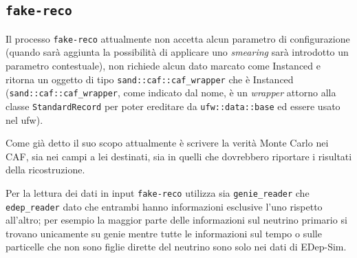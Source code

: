 \documentclass[../../main.tex]{subfiles}
\begin{document}
\subsection*{\texttt{fake-reco}}
  Il processo \texttt{fake-reco} attualmente non accetta alcun parametro di
  configurazione (quando sarà aggiunta la possibilità di applicare uno
  \textit{smearing} sarà introdotto un parametro contestuale), non richiede
  alcun dato marcato come Instanced e ritorna un oggetto di tipo
  \texttt{sand::caf::caf\_wrapper} che è Instanced
  (\texttt{sand::caf::caf\_wrapper}, come indicato dal nome, è un
  \textit{wrapper} attorno alla classe \texttt{StandardRecord} per poter
  ereditare da \texttt{ufw::data::base} ed essere usato nel ufw).

  Come già detto il suo scopo attualmente è scrivere la verità Monte Carlo nei
  CAF, sia nei campi a lei destinati, sia in quelli che dovrebbero riportare
  i risultati della ricostruzione.

  Per la lettura dei dati in input \texttt{fake-reco} utilizza sia
  \texttt{genie\_reader} che \texttt{edep\_reader} dato che entrambi hanno
  informazioni esclusive l'uno rispetto all'altro; per esempio la maggior
  parte delle informazioni sul neutrino primario si trovano unicamente su
  genie mentre tutte le informazioni sul tempo o sulle particelle che non
  sono figlie dirette del neutrino sono solo nei dati di EDep-Sim.
\end{document}
